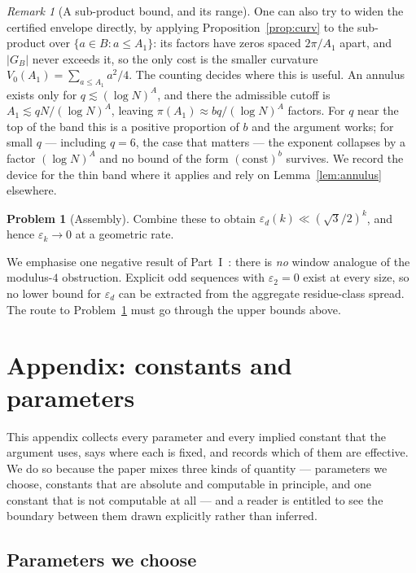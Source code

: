 \documentclass[11pt,a4paper]{article}
\theoremstyle{plain}
\theoremstyle{definition}
\newtheorem{problem}[theorem]{Problem}
\theoremstyle{remark}
\newtheorem{remark}[theorem]{Remark}
\begin{document}
\begin{remark}[A sub-product bound, and its range]\label{rem:subproduct}
One can also try to widen the certified envelope directly, by applying
Proposition~\ref{prop:curv} to the sub-product over $\{a\in B:a\le A_1\}$: its
factors have zeros spaced $2\pi/A_1$ apart, and $|G_B|$ never exceeds it, so the
only cost is the smaller curvature $V_0(A_1)=\sum_{a\le A_1}a^{2}/4$. The
counting decides where this is useful. An annulus exists only for
$q\lesssim(\log N)^{A}$, and there the admissible cutoff is
$A_1\lesssim qN/(\log N)^{A}$, leaving $\pi(A_1)\approx bq/(\log N)^{A}$
factors. For $q$ near the top of the band this is a positive proportion of $b$
and the argument works; for small $q$ --- including $q=6$, the case that
matters --- the exponent collapses by a factor $(\log N)^{A}$ and no bound of
the form $(\text{const})^{b}$ survives. We record the device for the thin band
where it applies and rely on Lemma~\ref{lem:annulus} elsewhere.
\end{remark}

\begin{problem}[Assembly]\label{prob:assembly}
Combine these to obtain $\varepsilon_d(k)\ll(\sqrt3/2)^{k}$, and hence
$\varepsilon_k\to0$ at a geometric rate.
\end{problem}

\noindent
We emphasise one negative result of Part~I~\cite{P1}: there is \emph{no}
window analogue of the modulus-$4$ obstruction. Explicit odd sequences with
$\varepsilon_2=0$ exist at every size, so no lower bound for $\varepsilon_d$ can
be extracted from the aggregate residue-class spread. The route to
Problem~\ref{prob:assembly} must go through the upper bounds above.

\section{Appendix: constants and parameters}\label{sec:constants}

This appendix collects every parameter and every implied constant that the
argument uses, says where each is fixed, and records which of them are
effective. We do so because the paper mixes three kinds of quantity ---
parameters we choose, constants that are absolute and computable in principle,
and one constant that is not computable at all --- and a reader is entitled to
see the boundary between them drawn explicitly rather than inferred.

\subsection{Parameters we choose}
\end{document}
